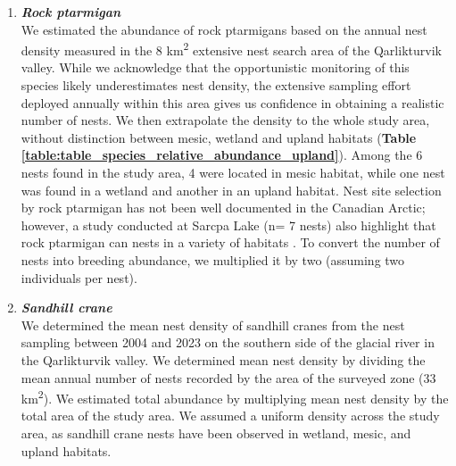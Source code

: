 \documentclass[a4paper,twoside,12pt]{article}
\begin{document}
\begin{enumerate}[label=\alph*.]
                \item[] \textit{\textbf{Rock ptarmigan}}\\
                We estimated the abundance of rock ptarmigans based on the annual nest density measured in the 8 km\textsuperscript{2} extensive nest search area of the Qarlikturvik valley. While we acknowledge that the opportunistic monitoring of this species likely underestimates nest density, the extensive sampling effort deployed annually within this area gives us confidence in obtaining a realistic number of nests. We then extrapolate the density to the whole study area, without distinction between mesic, wetland and upland habitats (\textbf{Table \ref{table:table_species_relative_abundance_upland}}). Among the 6 nests found in the study area, 4 were located in mesic habitat, while one nest was found in a wetland and another in an upland habitat. Nest site selection by rock ptarmigan has not been well documented in the Canadian Arctic; however, a study conducted at Sarcpa Lake (n= 7 nests) also highlight that rock ptarmigan can nests in a variety of habitats \citep{montgomerie1983}. To convert the number of nests into breeding abundance, we multiplied it by two (assuming two individuals per nest).
                
                \item[] \textit{\textbf{Sandhill crane}}\\
               We determined the mean nest density of sandhill cranes from the nest sampling between 2004 and 2023 on the southern side of the glacial river in the Qarlikturvik valley. We determined mean nest density by dividing the mean annual number of nests recorded by the area of the surveyed zone (33 km\textsuperscript{2}). We estimated total abundance by multiplying mean nest density by the total area of the study area. We assumed a uniform density across the study area, as sandhill crane nests have been observed in wetland, mesic, and upland habitats.
                

\end{enumerate}
\end{document}
